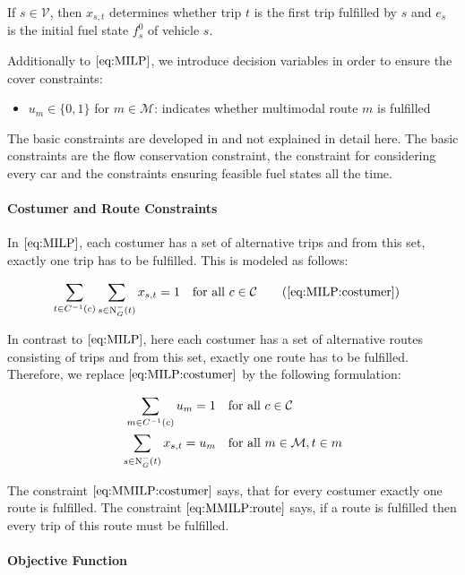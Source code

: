 If $s\in\mathcal{V}$, then $x_{s,t}$ determines whether trip $t$ is the first trip fulfilled by $s$ and $e_s$ is the initial fuel state $f^0_s$ of vehicle $s$.

Additionally to $\eqref{eq:MILP}$, we introduce decision variables in order to ensure the cover constraints:

\begin{itemize}
	\item{$u_m\in\{0,1\}$ for $m\in\mathcal{M}$: indicates whether multimodal route $m$ is fulfilled}
\end{itemize}

The basic constraints are developed in \cite[pp. 21-34]{Kaiser_Knoll} and not explained in detail here. The basic constraints are the flow conservation constraint, the constraint for considering every car and the constraints ensuring feasible fuel states all the time.

\paragraph{Costumer and Route Constraints} \parfill

In $\eqref{eq:MILP}$, each costumer has a set of alternative trips and from this set, exactly one trip has to be fulfilled. This is modeled as follows:

\begin{align*}
	\sum_{t\in C^{-1}(c)} \sum_{s\in\Nin(t)} x_{s,t} = 1 &&& \text{for all } c\in\mathcal{C} \tag{\ref{eq:MILP:costumer}}
\end{align*}

In contrast to $\eqref{eq:MILP}$, here each costumer has a set of alternative routes consisting of trips and from this set, exactly one route has to be fulfilled. Therefore, we replace $\eqref{eq:MILP:costumer}$ by the following formulation:

\begin{align}
	\sum_{m\in C^{-1}(c)} u_m = 1 &&& \text{for all } c\in\mathcal{C} \label{eq:MMILP:costumer} \\
	\sum_{s\in\operatorname{N}_G^-(t)} x_{s,t} = u_m &&& \text{for all } m\in\mathcal{M}, t\in m \label{eq:MMILP:route}
\end{align}

The constraint $\eqref{eq:MMILP:costumer}$ says, that for every costumer exactly one route is fulfilled. The constraint $\eqref{eq:MMILP:route}$ says, if a route is fulfilled then every trip of this route must be fulfilled.

\paragraph{Objective Function} \parfill

